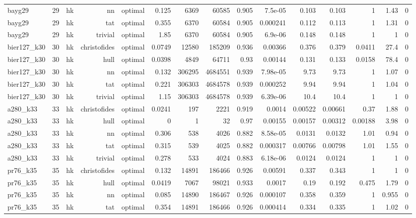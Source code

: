 \begin{tabular}{lrrrrrrrrrrrrrr}
bayg29 & 29 & hk & nn & optimal & 0.125 & 6369 & 60585 & 0.905 & 7.5e-05 & 0.103 & 0.103 & 1 & 1.43 & 0 \\
bayg29 & 29 & hk & tat & optimal & 0.355 & 6370 & 60584 & 0.905 & 0.000241 & 0.112 & 0.113 & 1 & 1.31 & 0 \\
bayg29 & 29 & hk & trivial & optimal & 1.85 & 6370 & 60584 & 0.905 & 6.9e-06 & 0.148 & 0.148 & 1 & 1 & 0 \\
bier127\_k30 & 30 & hk & christofides & optimal & 0.0749 & 12580 & 185209 & 0.936 & 0.00366 & 0.376 & 0.379 & 0.0411 & 27.4 & 0 \\
bier127\_k30 & 30 & hk & hull & optimal & 0.0398 & 4849 & 64711 & 0.93 & 0.00144 & 0.131 & 0.133 & 0.0158 & 78.4 & 0 \\
bier127\_k30 & 30 & hk & nn & optimal & 0.132 & 306295 & 4684551 & 0.939 & 7.98e-05 & 9.73 & 9.73 & 1 & 1.07 & 0 \\
bier127\_k30 & 30 & hk & tat & optimal & 0.221 & 306303 & 4684578 & 0.939 & 0.000252 & 9.94 & 9.94 & 1 & 1.04 & 0 \\
bier127\_k30 & 30 & hk & trivial & optimal & 1.15 & 306303 & 4684578 & 0.939 & 6.39e-06 & 10.4 & 10.4 & 1 & 1 & 0 \\
a280\_k33 & 33 & hk & christofides & optimal & 0.0241 & 197 & 2221 & 0.919 & 0.0014 & 0.00522 & 0.00661 & 0.37 & 1.88 & 0 \\
a280\_k33 & 33 & hk & hull & optimal & 0 & 1 & 32 & 0.97 & 0.00155 & 0.00157 & 0.00312 & 0.00188 & 3.98 & 0 \\
a280\_k33 & 33 & hk & nn & optimal & 0.306 & 538 & 4026 & 0.882 & 8.58e-05 & 0.0131 & 0.0132 & 1.01 & 0.94 & 0 \\
a280\_k33 & 33 & hk & tat & optimal & 0.315 & 539 & 4025 & 0.882 & 0.000317 & 0.00766 & 0.00798 & 1.01 & 1.55 & 0 \\
a280\_k33 & 33 & hk & trivial & optimal & 0.278 & 533 & 4024 & 0.883 & 6.18e-06 & 0.0124 & 0.0124 & 1 & 1 & 0 \\
pr76\_k35 & 35 & hk & christofides & optimal & 0.132 & 14891 & 186466 & 0.926 & 0.00591 & 0.337 & 0.343 & 1 & 1 & 0 \\
pr76\_k35 & 35 & hk & hull & optimal & 0.0419 & 7067 & 98021 & 0.933 & 0.0017 & 0.19 & 0.192 & 0.475 & 1.79 & 0 \\
pr76\_k35 & 35 & hk & nn & optimal & 0.085 & 14890 & 186467 & 0.926 & 0.000107 & 0.358 & 0.359 & 1 & 0.955 & 0 \\
pr76\_k35 & 35 & hk & tat & optimal & 0.354 & 14891 & 186466 & 0.926 & 0.000414 & 0.334 & 0.335 & 1 & 1.02 & 0 \\

\end{tabular}
